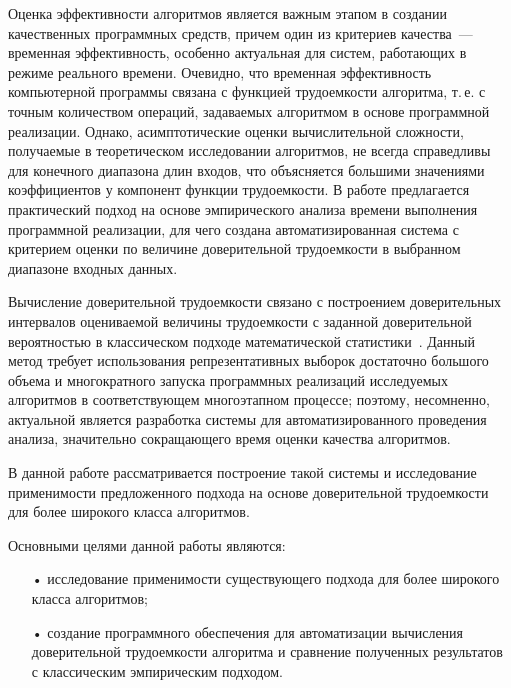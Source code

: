 \documentclass[a4paper, article, 14pt]{extarticle}
\begin{document}
\newpage

\tableofcontents

\newpage

\label{sec:introduction}

Оценка эффективности алгоритмов является важным этапом в создании качественных программных средств, причем один из критериев качества~--- временная эффективность, особенно актуальная для систем, работающих в режиме реального времени. Очевидно, что временная эффективность компьютерной программы связана с функцией трудоемкости алгоритма, т.\,е. с точным количеством операций, задаваемых алгоритмом в основе программной реализации. Однако, асимптотические оценки вычислительной сложности, получаемые в теоретическом исследовании алгоритмов, не всегда справедливы для конечного диапазона длин входов, что объясняется большими значениями коэффициентов у компонент функции трудоемкости. В работе предлагается практический подход на основе эмпирического анализа времени выполнения программной реализации, для чего создана автоматизированная система с критерием оценки по величине доверительной трудоемкости в выбранном диапазоне входных данных.

Вычисление доверительной трудоемкости связано с построением доверительных интервалов оцениваемой величины трудоемкости с заданной доверительной вероятностью в классическом подходе математической статистики~\cite{petrushyn_ulyanov_analysis}. Данный метод требует использования репрезентативных выборок достаточно большого объема и многократного запуска программных реализаций исследуемых алгоритмов в соответствующем многоэтапном процессе; поэтому, несомненно, актуальной является разработка системы для автоматизированного проведения анализа, значительно сокращающего время оценки качества алгоритмов.

В данной работе рассматривается построение такой системы и исследование применимости предложенного подхода на основе доверительной трудоемкости для более широкого класса алгоритмов.

\label{sec:problem_statement}

Основными целями данной работы являются:

\begin{enumerate}
	\item[•] исследование применимости существующего подхода для более широкого класса алгоритмов;

	\item[•] создание программного обеспечения для автоматизации вычисления доверительной трудоемкости алгоритма и сравнение полученных результатов с классическим эмпирическим подходом.
\end{enumerate}
\end{document}
